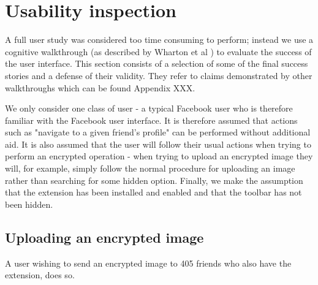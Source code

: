 \section{Usability inspection}
\label{sec:use}

A full user study was considered too time consuming to perform; instead we use a cognitive walkthrough (as described by Wharton et al \cite{cogwalk}) to evaluate the success of the user interface. This section consists of a selection of some of the final success stories and a defense of their validity. They refer to claims demonstrated by other walkthroughs which can be found Appendix XXX.

We only consider one class of user - a typical Facebook user who is therefore familiar with the Facebook user interface. It is therefore assumed that actions such as "navigate to a given friend's profile" can be performed without additional aid. It is also assumed that the user will follow their usual actions when trying to perform an encrypted operation - when trying to upload an encrypted image they will, for example, simply follow the normal procedure for uploading an image rather than searching for some hidden option. Finally, we make the assumption that the extension has been installed and enabled and that the toolbar has not been hidden.


\subsection{Uploading an encrypted image}
A user wishing to send an encrypted image to 405 friends who also have the extension, does so.

